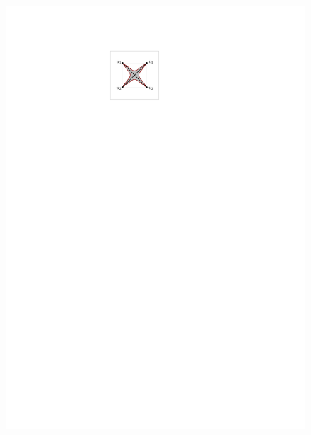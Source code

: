 \begin{figure}[htb]
\begin{minipage}[b]{.24\textwidth}
        \includegraphics[width=\textwidth,page=2]{images/3planar_one_crossing}
        \subcaption{~}\label{fig:3_planar_one_crossing_after}
    \end{minipage}
		\begin{minipage}[b]{.24\textwidth}
        \centering

\end{minipage}
\end{figure}
